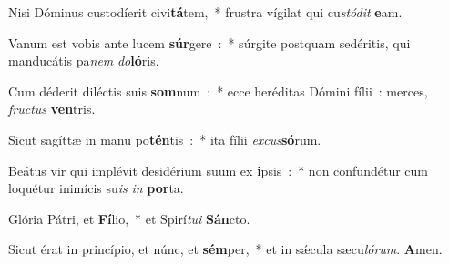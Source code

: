 ﻿\item Nisi Dóminus custodíerit civi\textbf{tá}tem,~* frustra vígilat qui cu\emph{stó}\emph{dit} \textbf{e}am.
\item Vanum est vobis ante lucem \textbf{súr}gere~:~* súrgite postquam sedéritis, qui manducátis pa\emph{nem} \emph{do}\textbf{ló}ris.
\item Cum déderit diléctis suis \textbf{som}num~:~* ecce heréditas Dómini fílii~: merces, \emph{fru}\emph{ctus} \textbf{ven}tris.
\item Sicut sagíttæ in manu po\textbf{tén}tis~:~* ita fílii \emph{ex}\emph{cus}\textbf{só}rum.
\item Beátus vir qui implévit desidérium suum ex \textbf{i}psis~:~* non confundétur cum loquétur inimícis su\emph{is} \emph{in} \textbf{por}ta.
\item Glória Pátri, et \textbf{Fí}lio,~* et Spirí\emph{tu}\emph{i} \textbf{Sán}cto.
\item Sicut érat in princípio, et núnc, et \textbf{sém}per,~* et in sǽcula sæcu\emph{ló}\emph{rum}. \textbf{A}men.
